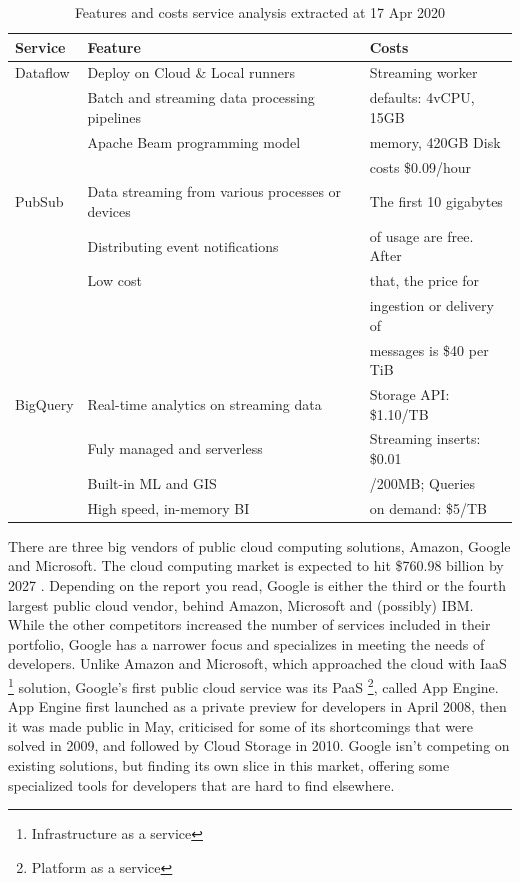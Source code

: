 \begin{table}[h!]
  \begin{center}
    \label{tab:table2}
    \begin{tabular}{l l l} %
      \textbf{Service} & \textbf{Feature} & \textbf{Costs}\\
      \hline
        Dataflow & Deploy on Cloud \& Local runners & Streaming worker\\
        & Batch and streaming data processing pipelines & defaults: 4vCPU, 15GB \\
        & Apache Beam programming model & memory, 420GB Disk\\
        & & costs \$0.09/hour \\
      \hline
        PubSub & Data streaming from various processes or devices & The first 10 gigabytes \\
        & Distributing event notifications & of usage are free. After \\
        & Low cost & that, the price for \\
        & & ingestion or delivery of \\
        & & messages is \$40 per TiB \\
      \hline
        BigQuery & Real-time analytics on streaming data & Storage API: \$1.10/TB \\
        & Fuly managed and serverless & Streaming inserts: \$0.01 \\
        & Built-in ML and GIS & /200MB; Queries \\
        & High speed, in-memory BI & on demand: \$5/TB \\
    \end{tabular}
    \caption{Features and costs service analysis extracted at 17 Apr 2020}
  \end{center}
\end{table}

There are three big vendors of public cloud computing solutions, Amazon, Google and Microsoft. The cloud computing market is expected to hit \$760.98 billion by 2027 \cite{market_cloud}. Depending on the report you read, Google is either the third or the fourth largest public cloud vendor, behind Amazon, Microsoft and (possibly) IBM. While the other competitors increased the number of services included in their portfolio, Google has a narrower focus and specializes in meeting the needs of developers. Unlike Amazon and Microsoft, which approached the cloud with IaaS \footnote{Infrastructure as a service} solution, Google's first public cloud service was its PaaS \footnote{Platform as a service}, called App Engine. App Engine first launched as a private preview for developers in April 2008, then it was made public in May, criticised for some of its shortcomings that were solved in 2009, and followed by Cloud Storage in 2010. Google isn't competing on existing solutions, but finding its own slice in this market, offering some specialized tools for developers that are hard to find elsewhere.

